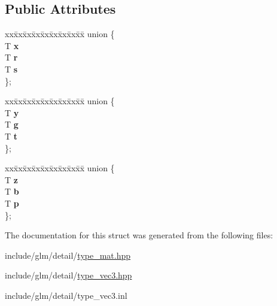 \subsection*{Public Attributes}
\begin{DoxyCompactItemize}
\item 
\mbox{\label{structglm_1_1tvec3_a78e5ba0f29b48952c41c492411b6a6b6}} 
\begin{tabbing}
xx\=xx\=xx\=xx\=xx\=xx\=xx\=xx\=xx\=\kill
union \{\\
\>T {\bfseries x}\\
\>T {\bfseries r}\\
\>T {\bfseries s}\\
\}; \\

\end{tabbing}\item 
\mbox{\label{structglm_1_1tvec3_a5812cad033493763e2a520718b4073ab}} 
\begin{tabbing}
xx\=xx\=xx\=xx\=xx\=xx\=xx\=xx\=xx\=\kill
union \{\\
\>T {\bfseries y}\\
\>T {\bfseries g}\\
\>T {\bfseries t}\\
\}; \\

\end{tabbing}\item 
\mbox{\label{structglm_1_1tvec3_a274b9cf07775687e4cd524a6aff81220}} 
\begin{tabbing}
xx\=xx\=xx\=xx\=xx\=xx\=xx\=xx\=xx\=\kill
union \{\\
\>T {\bfseries z}\\
\>T {\bfseries b}\\
\>T {\bfseries p}\\
\}; \\

\end{tabbing}\end{DoxyCompactItemize}


The documentation for this struct was generated from the following files\+:\begin{DoxyCompactItemize}
\item 
include/glm/detail/\hyperlink{type__mat_8hpp}{type\+\_\+mat.\+hpp}\item 
include/glm/detail/\hyperlink{type__vec3_8hpp}{type\+\_\+vec3.\+hpp}\item 
include/glm/detail/type\+\_\+vec3.\+inl\end{DoxyCompactItemize}

